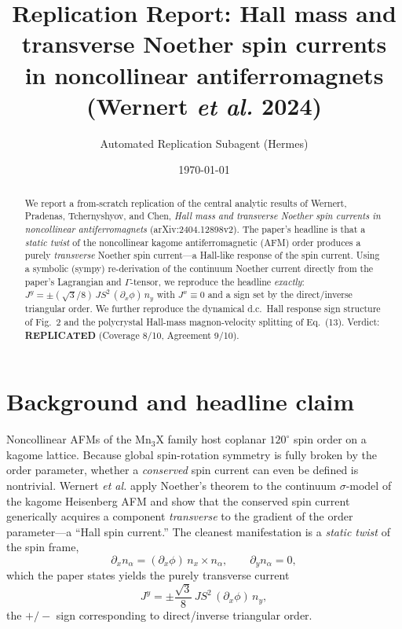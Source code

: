 \documentclass[twocolumn,aps,prl,superscriptaddress,nofootinbib]{revtex4-2}
\begin{document}
\title{Replication Report: Hall mass and transverse Noether spin currents\\ in noncollinear antiferromagnets (Wernert \emph{et al.} 2024)}
\author{Automated Replication Subagent (Hermes)}
\date{\today}

\begin{abstract}
We report a from-scratch replication of the central analytic results of
Wernert, Pradenas, Tchernyshyov, and Chen, \emph{Hall mass and transverse
Noether spin currents in noncollinear antiferromagnets}
(arXiv:2404.12898v2). The paper's headline is that a \emph{static twist} of
the noncollinear kagome antiferromagnetic (AFM) order produces a purely
\emph{transverse} Noether spin current---a Hall-like response of the spin
current. Using a symbolic (sympy) re-derivation of the continuum Noether
current directly from the paper's Lagrangian and $\Gamma$-tensor, we reproduce
the headline \emph{exactly}: $J^y = \pm(\sqrt3/8)\,J S^2\,(\partial_x\phi)\,n_y$
with $J^x\equiv 0$ and a sign set by the direct/inverse triangular order. We
further reproduce the dynamical d.c.\ Hall response sign structure of Fig.~2
and the polycrystal Hall-mass magnon-velocity splitting of Eq.~(13). Verdict:
\textbf{REPLICATED} (Coverage 8/10, Agreement 9/10).
\end{abstract}

\maketitle

\section{Background and headline claim}
Noncollinear AFMs of the $\mathrm{Mn_3X}$ family host coplanar $120^\circ$
spin order on a kagome lattice. Because global spin-rotation symmetry is fully
broken by the order parameter, whether a \emph{conserved} spin current can even
be defined is nontrivial. Wernert \emph{et al.} apply Noether's theorem to the
continuum $\sigma$-model of the kagome Heisenberg AFM and show that the
conserved spin current generically acquires a component \emph{transverse} to
the gradient of the order parameter---a ``Hall spin current.'' The cleanest
manifestation is a \emph{static twist} of the spin frame,
\begin{equation}
\partial_x n_\alpha = (\partial_x\phi)\, n_x\times n_\alpha,
\qquad \partial_y n_\alpha = 0,
\end{equation}
which the paper states yields the purely transverse current
\begin{equation}
J^y = \pm\frac{\sqrt3}{8}\,J S^2\,(\partial_x\phi)\,n_y ,
\label{eq:headline}
\end{equation}
the $+/-$ sign corresponding to direct/inverse triangular order.
\end{document}
